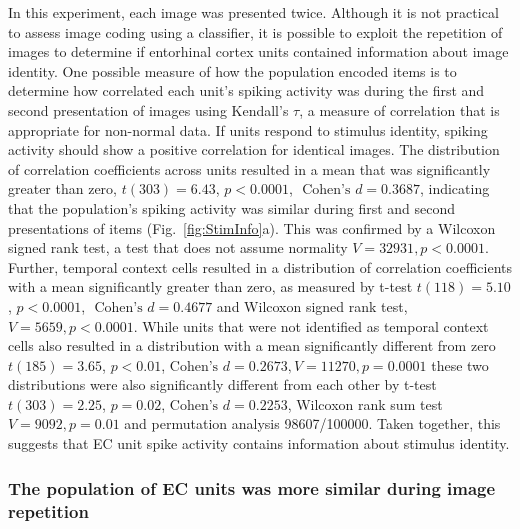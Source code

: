 \documentclass{apa}
\begin{document}
In this experiment, each image was presented twice.  Although it is not
practical to assess image coding using a classifier, it is possible to exploit
the repetition of images to determine if entorhinal cortex units contained
information about image identity. 
One possible measure of how the population encoded items 
is to determine how correlated each unit's spiking activity was during the first and
second presentation of images using Kendall's $\tau$, a measure of correlation
that is appropriate for non-normal data.
If units respond to stimulus identity, spiking activity should show a positive correlation
for identical images.
The distribution of correlation coefficients across
units resulted in a mean that was significantly 
greater than zero, $t(303)=6.43$, $p <0.0001$,
$\text{ Cohen's } d = 0.3687$, indicating that the 
population's spiking activity was
similar during first and second presentations of items
(Fig.~\ref{fig:StimInfo}a). This was confirmed by a Wilcoxon signed rank
test, a test that does not assume normality $V = 32931, p <0.0001$.
Further, temporal context cells resulted in
a distribution of correlation coefficients with a mean significantly greater
than zero, as measured by t-test $t(118)=5.10$, $p <0.0001$, $\text{ Cohen's } d = 0.4677$
and Wilcoxon signed rank test, $V = 5659, p <0.0001$.
While units that were not identified as temporal context cells
also resulted in a distribution with a mean
significantly different from zero $t(185)=3.65$, $p <0.01$,$\text{ Cohen's } d
= 0.2673, V = 11270, p = 0.0001$ these two distributions were also significantly
different from each other by t-test $t(303)=2.25$, $p =0.02$,$\text{ Cohen's } d = 0.2253$,
Wilcoxon rank sum test $V = 9092, p = 0.01$
and permutation analysis 98607/100000. 
Taken together, this suggests that EC unit spike activity
contains information about stimulus identity.


\subsubsection{The population of EC units was more similar during image repetition}
\end{document}
